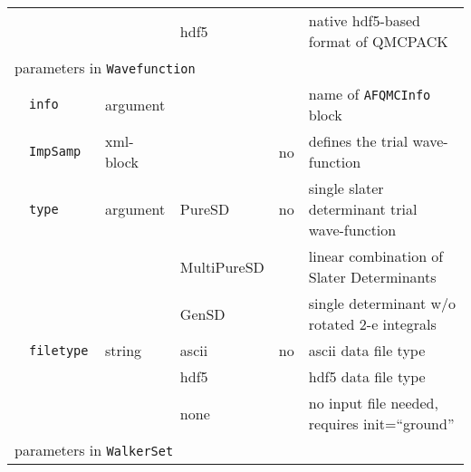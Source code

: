 \begin{table}[h]
\begin{center}
\begin{tabularx}{\textwidth}{l l l l l l }
   &   \texttt{                } &             & hdf5          &      & native hdf5-based format of QMCPACK  \\
\multicolumn{6}{l}{parameters in \texttt{Wavefunction}}\\
   &   \texttt{info            } &  argument   &             &      & name of \texttt{AFQMCInfo} block \\
   &   \texttt{ImpSamp         } &  xml-block  &             & no   & defines the trial wave-function \\
   &   \texttt{type            } &  argument   & PureSD      & no   & single slater determinant trial wave-function \\
   &   \texttt{                } &             & MultiPureSD &      & linear combination of Slater Determinants \\
   &   \texttt{                } &             & GenSD       &      & single determinant w/o rotated 2-e integrals \\
   &   \texttt{filetype        } &  string     & ascii       & no   & ascii data file type \\
   &   \texttt{                } &             & hdf5        &      & hdf5 data file type \\
   &   \texttt{                } &             & none        &      & no input file needed, requires init=``ground'' \\
\multicolumn{6}{l}{parameters in \texttt{WalkerSet}} \\

\end{tabularx}
\end{center}
\end{table}
